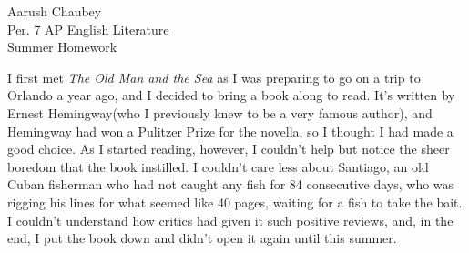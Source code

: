 \documentclass[11pt]{scrartcl}
\title{}
\author{}
\date{}
\begin{document}
\begin{flushright}
Aarush Chaubey\\
Per. 7 AP English Literature\\
Summer Homework\\
\end{flushright}

\begin{spacing}{2}
I first met \textit{The Old Man and the Sea} as I was preparing to go on a trip to Orlando a year ago, and I decided to bring a book along to read. It's written by Ernest Hemingway(who I previously knew to be a very famous author), and Hemingway had won a Pulitzer Prize for the novella, so I thought I had made a good choice. As I started reading, however, I couldn't help but notice the sheer boredom that the book instilled. I couldn't care less about Santiago, an old Cuban fisherman who had not caught any fish for 84 consecutive days, who was rigging his lines for what seemed like 40 pages, waiting for a fish to take the bait. I couldn't understand how critics had given it such positive reviews, and, in the end, I put the book down and didn't open it again until this summer.



\end{spacing}
\end{document}
